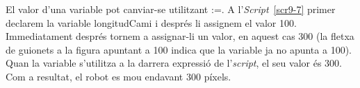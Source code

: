 El valor d'una variable pot canviar-se utilitzant \textsf{:=}. A l'\emph{Script}~\ref{scr9-7} primer declarem la variable \textsf{longitudCami} i després li assignem el valor \textsf{100}.  Immediatament després tornem a assignar-li un valor, en aquest cas \textsf{300} (la fletxa de guionets a la figura apuntant a \textsf{100} indica que la variable ja no apunta a \textsf{100}). Quan la variable s'utilitza a la darrera expressió de l'\emph{script}, el seu valor és \textsf{300}. Com a resultat, el robot es mou endavant 300 píxels.   

